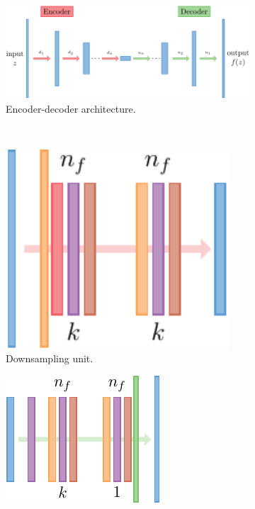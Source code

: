 \documentclass[review]{elsarticle}
\begin{document}
\begin{figure}[!tbp]%
  \centering%
  \begin{subfigure}[t]{1\textwidth}%
    \includegraphics[width=\textwidth]{./figs/encoder_decoder.pdf}%
    \caption{Encoder-decoder architecture.}\label{fig:encoder_decoder}%
  \end{subfigure}\\[0.3cm]%
  \begin{subfigure}[b]{0.33\textwidth}%
    \includegraphics[width=0.92\textwidth]{./figs/downsample.pdf}%
    \caption{Downsampling unit.}\label{fig:downsample}%
  \end{subfigure}%
  \hfill%
  \begin{subfigure}[b]{0.33\textwidth}%
    \includegraphics[width=\textwidth]{./figs/upsample.pdf}%

\end{subfigure}
\end{figure}
\end{document}

